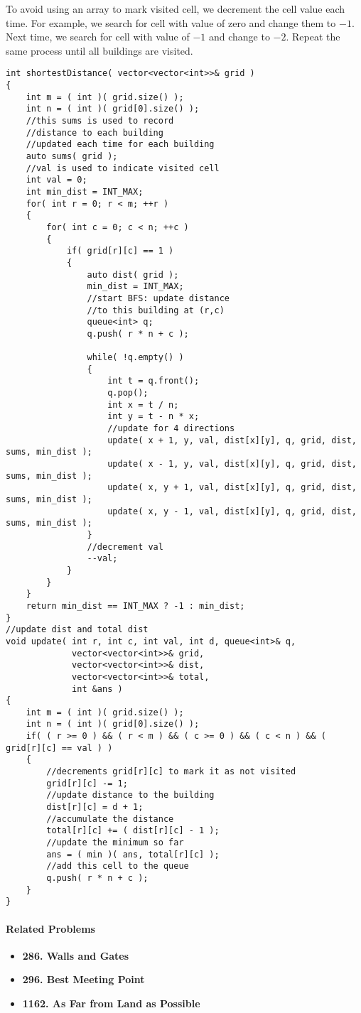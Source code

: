 To avoid using an array to mark visited cell, we decrement the cell value each time. For example, we search for cell with value of zero and change them to $-1$. Next time, we search for cell with value of $-1$ and change to $-2$. Repeat the same process until all buildings are visited.

\setcounter{lstlisting}{0}
\begin{lstlisting}[style=customc, caption={BFS}]
int shortestDistance( vector<vector<int>>& grid )
{
    int m = ( int )( grid.size() );
    int n = ( int )( grid[0].size() );
    //this sums is used to record
    //distance to each building
    //updated each time for each building
    auto sums( grid );
    //val is used to indicate visited cell
    int val = 0;
    int min_dist = INT_MAX;
    for( int r = 0; r < m; ++r )
    {
        for( int c = 0; c < n; ++c )
        {
            if( grid[r][c] == 1 )
            {
                auto dist( grid );
                min_dist = INT_MAX;
                //start BFS: update distance
                //to this building at (r,c)
                queue<int> q;
                q.push( r * n + c );

                while( !q.empty() )
                {
                    int t = q.front();
                    q.pop();
                    int x = t / n;
                    int y = t - n * x;
                    //update for 4 directions
                    update( x + 1, y, val, dist[x][y], q, grid, dist, sums, min_dist );
                    update( x - 1, y, val, dist[x][y], q, grid, dist, sums, min_dist );
                    update( x, y + 1, val, dist[x][y], q, grid, dist, sums, min_dist );
                    update( x, y - 1, val, dist[x][y], q, grid, dist, sums, min_dist );
                }
                //decrement val
                --val;
            }
        }
    }
    return min_dist == INT_MAX ? -1 : min_dist;
}
//update dist and total dist
void update( int r, int c, int val, int d, queue<int>& q,
             vector<vector<int>>& grid,
             vector<vector<int>>& dist,
             vector<vector<int>>& total,
             int &ans )
{
    int m = ( int )( grid.size() );
    int n = ( int )( grid[0].size() );
    if( ( r >= 0 ) && ( r < m ) && ( c >= 0 ) && ( c < n ) && ( grid[r][c] == val ) )
    {
        //decrements grid[r][c] to mark it as not visited
        grid[r][c] -= 1;
        //update distance to the building
        dist[r][c] = d + 1;
        //accumulate the distance
        total[r][c] += ( dist[r][c] - 1 );
        //update the minimum so far
        ans = ( min )( ans, total[r][c] );
        //add this cell to the queue
        q.push( r * n + c );
    }
}
\end{lstlisting}

\paragraph{Related Problems}
\begin{itemize}
\item \textbf{286. Walls and Gates}
\item \textbf{296. Best Meeting Point}
\item \textbf{1162. As Far from Land as Possible}
\end{itemize}